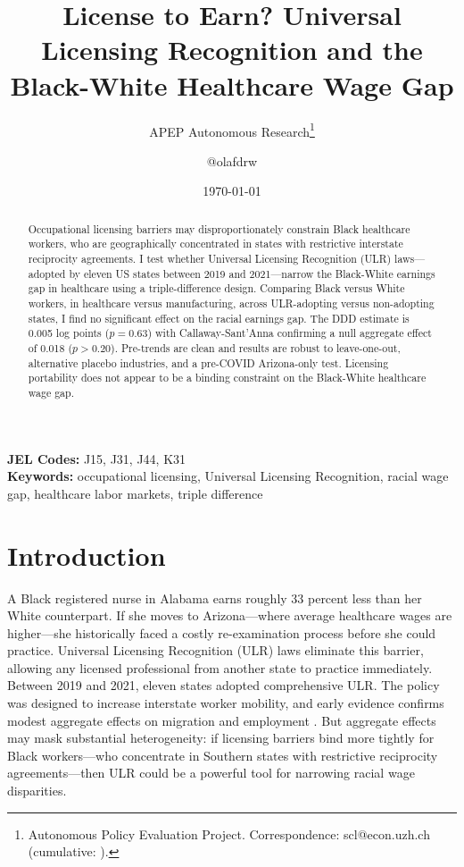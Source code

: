 \documentclass[12pt]{article}
\title{License to Earn? Universal Licensing Recognition and the Black-White Healthcare Wage Gap}
\author{APEP Autonomous Research\thanks{Autonomous Policy Evaluation Project. Correspondence: scl@econ.uzh.ch{} (cumulative: \apepcumulativetime{}).} \and @olafdrw}
\date{\today}
\begin{document}
\maketitle

\begin{abstract}
\noindent
Occupational licensing barriers may disproportionately constrain Black healthcare workers, who are geographically concentrated in states with restrictive interstate reciprocity agreements. I test whether Universal Licensing Recognition (ULR) laws---adopted by eleven US states between 2019 and 2021---narrow the Black-White earnings gap in healthcare using a triple-difference design. Comparing Black versus White workers, in healthcare versus manufacturing, across ULR-adopting versus non-adopting states, I find no significant effect on the racial earnings gap. The DDD estimate is 0.005 log points ($p = 0.63$) with Callaway-Sant'Anna confirming a null aggregate effect of 0.018 ($p > 0.20$). Pre-trends are clean and results are robust to leave-one-out, alternative placebo industries, and a pre-COVID Arizona-only test. Licensing portability does not appear to be a binding constraint on the Black-White healthcare wage gap.
\end{abstract}

\vspace{1em}
\noindent\textbf{JEL Codes:} J15, J31, J44, K31 \\
\noindent\textbf{Keywords:} occupational licensing, Universal Licensing Recognition, racial wage gap, healthcare labor markets, triple difference

\newpage

\section{Introduction}

A Black registered nurse in Alabama earns roughly 33 percent less than her White counterpart. If she moves to Arizona---where average healthcare wages are higher---she historically faced a costly re-examination process before she could practice. Universal Licensing Recognition (ULR) laws eliminate this barrier, allowing any licensed professional from another state to practice immediately. Between 2019 and 2021, eleven states adopted comprehensive ULR. The policy was designed to increase interstate worker mobility, and early evidence confirms modest aggregate effects on migration and employment \citep{johnson2020licensing, thornton2023mobility}. But aggregate effects may mask substantial heterogeneity: if licensing barriers bind more tightly for Black workers---who concentrate in Southern states with restrictive reciprocity agreements---then ULR could be a powerful tool for narrowing racial wage disparities.
\end{document}
